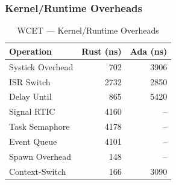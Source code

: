 \subsubsection{Kernel/Runtime Overheads}
\begin{table}[H]
  \centering
  \begin{tabular*}{\linewidth}{@{\extracolsep{\fill}}lrr@{}}
    \toprule
    \textbf{Operation} & \textbf{Rust (\unit{ns})} & \textbf{Ada (\unit{ns})} \\
    \midrule
    Systick Overhead & 702 & 3906 \\
    ISR Switch & 2732 & 2850 \\
    Delay Until & 865 & 5420 \\
    Signal RTIC & 4160 & -- \\
    Task Semaphore & 4178 & -- \\
    Event Queue & 4101 & -- \\
    Spawn Overhead & 148 & -- \\
    Context-Switch & 166 & 3090 \\
    \bottomrule
  \end{tabular*}
  \caption{WCET — Kernel/Runtime Overheads}
  \label{tab:wcet-kernel-overheads}
\end{table}
